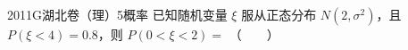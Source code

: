 
\begin{problem}{2011}{G}{湖北卷（理）}{5}{概率}
已知随机变量 $\xi$ 服从正态分布 $N(2,\sigma^2)$，且 $P(\xi<4)=0.8$，则 $P(0<\xi<2)=$ \hspace{1cm}（　　）
\begin{choices}
\end{choices}
\end{problem}

\begin{answer}

\end{answer}

\begin{solutions}

\end{solutions}